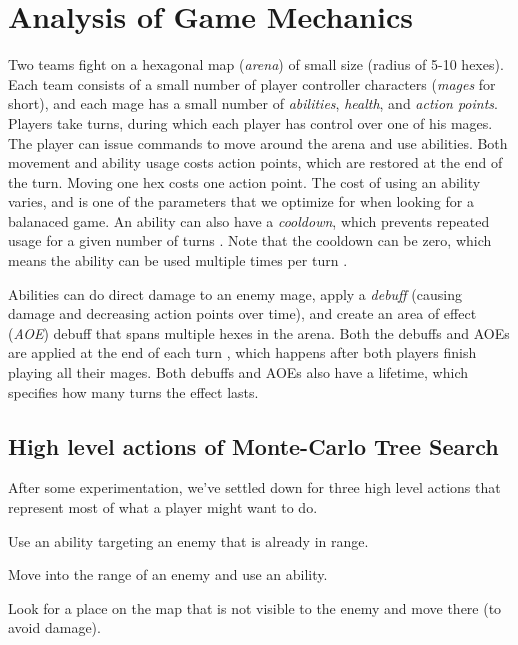 \chapter{Analysis of Game Mechanics}

Two teams fight on a hexagonal map (\emph{arena}) of small size (radius of
5-10 hexes). Each team consists of a small number of player controller
characters (\emph{mages} for short), and each mage has a small number of
\emph{abilities}, \emph{health}, and \emph{action points}. Players take turns, during
which each player has control over one of his mages. The player can issue
commands to move around the arena and use abilities. Both movement and ability
usage costs action points, which are restored at the end of the turn.  Moving
one hex costs one action point. The cost of using an ability varies, and is one
of the parameters that we optimize for when looking for a balanaced game. An
ability can also have a \emph{cooldown}, which prevents repeated usage for a
given number of turns . Note that the cooldown can
be zero, which means the ability can be used multiple times per turn
.


Abilities can do direct damage to an enemy mage, apply a \emph{debuff} (causing
damage and decreasing action points over time), and create an area of effect
(\emph{AOE}) debuff that spans multiple hexes in the arena. Both the debuffs and
AOEs are applied at the end of each turn , which happens after both players finish playing all their mages.
Both debuffs and AOEs also have a lifetime, which specifies how many turns
 the effect lasts.




\section{High level actions of Monte-Carlo Tree Search}

After some experimentation, we've settled down for three high level actions
that represent most of what a player might want to do.

\begin{description}[align=right,labelwidth=3cm]
\item [AbilityUse] Use an ability targeting an enemy that is already in range.
\item [AttackMove] Move into the range of an enemy and use an ability.
\item [DefensiveMove] Look for a place on the map that is not visible to the enemy and move there (to avoid damage).
\end{description}

